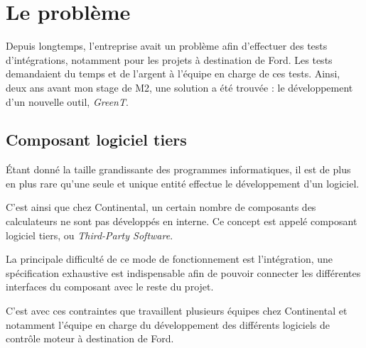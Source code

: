 \chapter{Le problème} \label{chapPb}
\putminitoc
Depuis longtemps, l'entreprise avait un problème afin d'effectuer des tests d'intégrations, notamment pour les projets à destination de Ford. Les tests demandaient du temps et de l'argent à l'équipe en charge de ces tests. Ainsi, deux ans avant mon stage de M2, une solution a été trouvée : le développement d'un nouvelle outil, \textit{GreenT}.
	\section{Composant logiciel tiers}
	Étant donné la taille grandissante des programmes informatiques, il est de plus en plus rare qu'une seule et unique entité effectue le développement d'un logiciel.
	
	C'est ainsi que chez Continental, un certain nombre de composants des calculateurs ne sont pas développés en interne. Ce concept est appelé composant logiciel tiers, ou \textit{Third-Party Software}. 
	
	La principale difficulté de ce mode de fonctionnement est l'intégration, une spécification exhaustive est indispensable afin de pouvoir connecter les différentes interfaces du composant avec le reste du projet. 
	
	C'est avec ces contraintes que travaillent plusieurs équipes chez Continental et notamment l'équipe en charge du développement des différents logiciels de contrôle moteur à destination de Ford.
	
